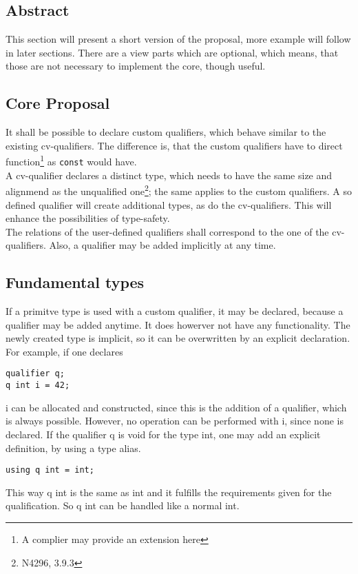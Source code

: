 \subsection*{Abstract}
This section will present a short version of the proposal, more example will follow in later sections. There are a view parts which are optional, which means, that those are not necessary to implement the core, though useful.
\subsection{Core Proposal} \label{prop:core}
It shall be possible to declare custom qualifiers, which behave similar to the existing cv-qualifiers. The difference is, that the custom qualifiers have to direct function\footnote{A complier may provide an extension here} as \lstinline {const} would have.\\
A cv-qualifier declares a distinct type, which needs to have the same size and alignmend as the unqualified one\footnote{N4296, 3.9.3}; the same applies to the custom qualifiers.
A so defined qualifier will create additional types, as do the cv-qualifiers. This will enhance the possibilities of type-safety.\\
The relations of the user-defined qualifiers shall correspond to the one of the cv-qualifiers. Also, a qualifier may be added implicitly at any time.
\subsection{Fundamental types}
If a primitve type is used with a custom qualifier, it may be declared, because a qualifier may be added anytime. It does howerver not have any functionality. The newly created type is implicit, so it can be overwritten by an explicit declaration.\\ 
For example, if one declares
\begin{lstlisting}
qualifier q;
q int i = 42;
\end{lstlisting}  
i can be allocated and constructed, since this is the addition of a qualifier, which is always possible. However, no operation can be performed with i, since none is declared. If the qualifier q is void for the type int, one may add an explicit definition, by using a type alias.
\begin{lstlisting}[firstnumber=3]
using q int = int;
\end{lstlisting}
This way q int is the same as int and it fulfills the requirements given for the qualification. So q int can be handled like a normal int.
